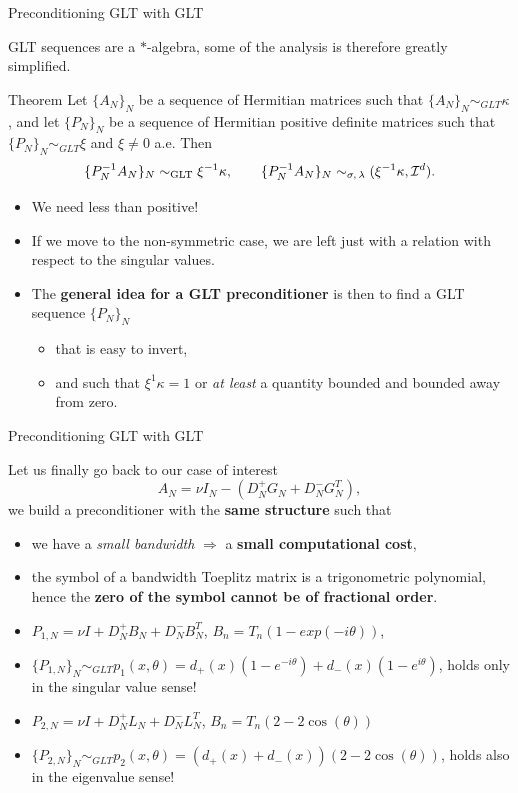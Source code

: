 \documentclass[aspectratio=169,xcolor=dvipsnames]{beamer}
\begin{document}
\begin{frame}{Preconditioning GLT with GLT}
	
GLT sequences are a $*$-algebra, some of the analysis is therefore greatly simplified.
\begin{alertblock}{Theorem \parencite[Section 8.4]{MR3674485} }
	Let $\{A_N\}_N$ be a \alert<3>{sequence of Hermitian matrices} such that $\{A_N\}_N\sim_{ GLT}\kappa$, and let $\{P_N\}_N$ be a \alert<3>{sequence of Hermitian positive definite matrices} such that $\{P_N\}_N\sim_{GLT}\xi$ and \alert<2>{$\xi\ne0$ a.e.} Then 
	\[ \{P_N^{-1}A_N\}_N\sim_{\rm GLT}\xi^{-1}\kappa,\qquad \{P_N^{-1}A_N\}_N\sim_{\sigma,\,\lambda}(\xi^{-1}\kappa,\mathcal{I}^d). \]
\end{alertblock}
	
\begin{itemize}
	\item[{\definecolor{success}{HTML}{4a934a}\textcolor{success}{\faSmile}}]<2-> We need less than positive!
	\item[\faWrench]<3-> If we move to the non-symmetric case, we are left just with a relation with respect to the singular values.
	\item[\faMagic]<4-> The \alert{\textbf{general idea for a GLT preconditioner}} is then to find a GLT sequence $\{P_N\}_N$
	\begin{itemize}
		\item \normalsize that is easy to invert,
		\item \normalsize and such that $\xi^{1} \kappa = 1$ or \emph{at least} a quantity bounded and bounded away from zero.
	\end{itemize}
\end{itemize}
	
\end{frame}

\begin{frame}{Preconditioning GLT with GLT}
	
Let us finally go back to our case of interest
\[
A_N = \nu I_N - \left( D_N^+ G_N + D_N^- G_N^T \right),
\]
we build a preconditioner with the \textbf{same structure} such that
\begin{itemize}
	\item[\faCogs] we have a \emph{small bandwidth} $\Rightarrow$ a \textbf{small computational cost},
	\item[\alert{\faBomb}]<2-> the symbol of a bandwidth Toeplitz
	matrix is a trigonometric polynomial, hence the \textbf{zero of the symbol cannot be of fractional order}.
	\item[\faLightbulb]<3-> $P_{1,N} = \nu I + D^+_N B_N + D^-_N B_N^T$, $B_n = T_n(1 - exp(-i\theta))$,
	\item[\faBook]<5-> $\{P_{1,N}\}_N \sim_{GLT} p_1(x,\theta) = d_+(x)(1-e^{-i\theta}) + d_-(x)(1-e^{i\theta})$, holds only in the singular value sense!
	\item[\faLightbulb]<4-> $P_{2,N} = \nu I + D^+_N L_N + D^-_N L_N^T$, $B_n = T_n(2 - 2\cos(\theta))$
	\item[\faBook]<6-> $\{P_{2,N}\}_N \sim_{GLT} p_2(x,\theta) = (d_+(x) + d_-(x))(2-2\cos(\theta))$, holds also in the eigenvalue sense!
\end{itemize}
\end{frame}
\end{document}

